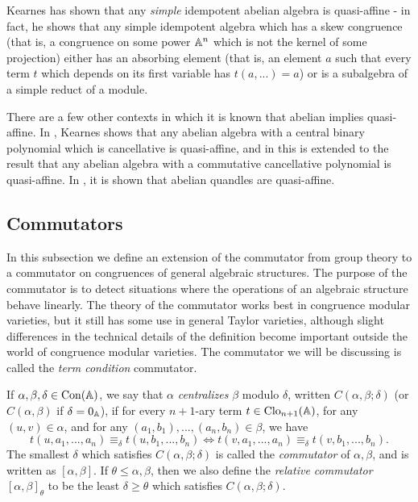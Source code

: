 \documentclass[letterpaper,11pt]{article}
\DeclareMathOperator{\Clo}{Clo}
\DeclareMathOperator{\Con}{Con}
\begin{document}
Kearnes \cite{kearnes-simple} has shown that any \emph{simple} idempotent abelian algebra is quasi-affine - in fact, he shows that any simple idempotent algebra which has a skew congruence (that is, a congruence on some power $\mathbb{A}^n$ which is not the kernel of some projection) either has an absorbing element (that is, an element $a$ such that every term $t$ which depends on its first variable has $t(a,...) = a$) or is a subalgebra of a simple reduct of a module.

There are a few other contexts in which it is known that abelian implies quasi-affine. In \cite{kearnes-quasi-affine}, Kearnes shows that any abelian algebra with a central binary polynomial which is cancellative is quasi-affine, and in \cite{stronkowski-embedding} this is extended to the result that any abelian algebra with a commutative cancellative polynomial is quasi-affine. In \cite{affine-quandles}, it is shown that abelian quandles are quasi-affine.


\subsection{Commutators}

In this subsection we define an extension of the commutator from group theory to a commutator on congruences of general algebraic structures. The purpose of the commutator is to detect situations where the operations of an algebraic structure behave linearly. The theory of the commutator works best in congruence modular varieties, but it still has some use in general Taylor varieties, although slight differences in the technical details of the definition become important outside the world of congruence modular varieties. The commutator we will be discussing is called the \emph{term condition} commutator.

\begin{defn} If $\alpha, \beta, \delta \in \Con(\bA)$, we say that $\alpha$ \emph{centralizes} $\beta$ modulo $\delta$, written $C(\alpha,\beta;\delta)$ (or $C(\alpha,\beta)$ if $\delta = 0_{\mathbb{A}}$), if for every $n+1$-ary term $t \in \Clo_{n+1}(\bA)$, for any $(u,v) \in \alpha$, and for any $(a_1,b_1), ..., (a_n,b_n) \in \beta$, we have
\[
t(u,a_1, ..., a_n) \equiv_\delta t(u,b_1, ..., b_n) \iff t(v,a_1,...,a_n) \equiv_\delta t(v,b_1,...,b_n).
\]
The smallest $\delta$ which satisfies $C(\alpha,\beta;\delta)$ is called the \emph{commutator} of $\alpha,\beta$, and is written as $[\alpha,\beta]$. If $\theta \le \alpha,\beta$, then we also define the \emph{relative commutator} $[\alpha,\beta]_\theta$ to be the least $\delta \ge \theta$ which satisfies $C(\alpha,\beta;\delta)$.
\end{defn}
\end{document}
